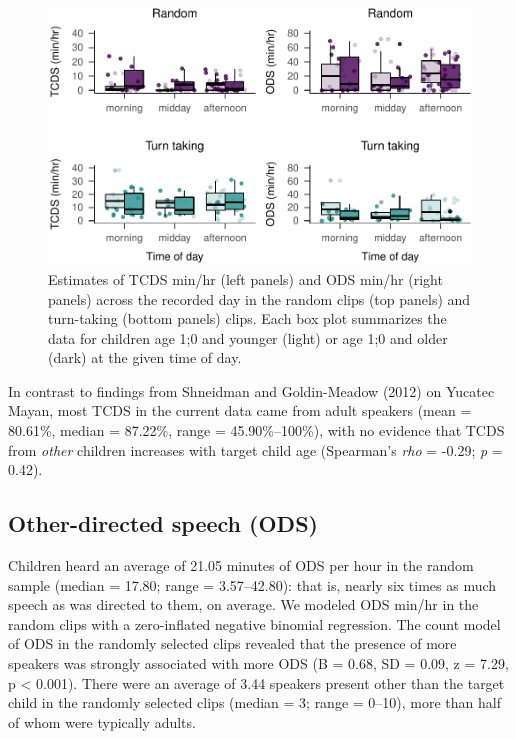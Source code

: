 \documentclass[floatsintext,man]{apa6}
\theoremstyle{definition}
\theoremstyle{definition}
\theoremstyle{definition}
\theoremstyle{remark}
\begin{document}
\begin{figure}
\centering
\includegraphics{Tseltal-CLE_files/figure-latex/fig5-1.pdf}
\caption{\label{fig:fig5}Estimates of TCDS min/hr (left panels) and ODS
min/hr (right panels) across the recorded day in the random clips (top
panels) and turn-taking (bottom panels) clips. Each box plot summarizes
the data for children age 1;0 and younger (light) or age 1;0 and older
(dark) at the given time of day.}
\end{figure}

In contrast to findings from Shneidman and Goldin-Meadow (2012) on
Yucatec Mayan, most TCDS in the current data came from adult speakers
(mean = 80.61\%, median = 87.22\%, range = 45.90\%--100\%), with no
evidence that TCDS from \emph{other} children increases with target
child age (Spearman's \emph{rho} = -0.29; \emph{p} = 0.42).

\subsection{Other-directed speech
(ODS)}\label{other-directed-speech-ods}

Children heard an average of 21.05 minutes of ODS per hour in the random
sample (median = 17.80; range = 3.57--42.80): that is, nearly six times
as much speech as was directed to them, on average. We modeled ODS
min/hr in the random clips with a zero-inflated negative binomial
regression. The count model of ODS in the randomly selected clips
revealed that the presence of more speakers was strongly associated with
more ODS (B = 0.68, SD = 0.09, z = 7.29, p \textless{} 0.001). There
were an average of 3.44 speakers present other than the target child in
the randomly selected clips (median = 3; range = 0--10), more than half
of whom were typically adults.
\end{document}
